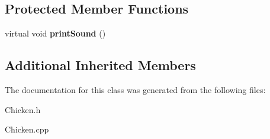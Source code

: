 \subsection*{Protected Member Functions}
\begin{DoxyCompactItemize}
\item 
\mbox{\label{class_chicken_a43a91e7cc5bf7958a5052f894f1bfede}} 
virtual void {\bfseries print\+Sound} ()
\end{DoxyCompactItemize}
\subsection*{Additional Inherited Members}


The documentation for this class was generated from the following files\+:\begin{DoxyCompactItemize}
\item 
Chicken.\+h\item 
Chicken.\+cpp\end{DoxyCompactItemize}
